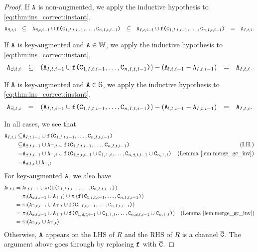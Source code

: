 \begin{proof}
If $\tt{A}$ is non-augmented, we apply the inductive hypothesis to \eqref{eq:thm:ins_correct:instant},
\begin{align*}
\tt{A}_{\exists,t,i}
&&\subseteq&& \tt{A}_{\exists,t,i-1} \cup \tt{f}\tt{(}\tt{C}_{1,I,t,i-1}, \dots, \tt{C}_{n,I,t,i-1}\tt{)}
&&\subseteq&& \tt{A}_{I,t,i-1} \cup \tt{f}\tt{(}\tt{C}_{1,I,t,i-1}, \dots, \tt{C}_{n,I,t,i-1}\tt{)}
&&=&& \tt{A}_{I,t,i}.
\end{align*}

If $\tt{A}$ is key-augmented and $\tt{A} \in \mathbb{W}$, we apply the inductive hypothesis to \eqref{eq:thm:ins_correct:instant},
\begin{align*}
\tt{A}_{\exists,t,i}
&&\subseteq&& (\tt{A}_{I,t,i-1} \cup \tt{f}\tt{(}\tt{C}_{1,I,t,i-1}, \dots, \tt{C}_{n,I,t,i-1}\tt{)}) - (\tt{A}_{!,t,i-1} - \tt{A}_{I,t,i-1})
&&=&& \tt{A}_{I,t,i}.
\end{align*}

If $\tt{A}$ is key-augmented and $\tt{A} \in \mathbb{S}$, we apply the inductive hypothesis to \eqref{eq:thm:ins_correct:instant},
\begin{align*}
\tt{A}_{\exists,t,i}
&&=&& (\tt{A}_{I,t,i-1} \cup \tt{f}\tt{(}\tt{C}_{1,I,t,i-1}, \dots, \tt{C}_{n,I,t,i-1}\tt{)}) - (\tt{A}_{!,t,i-1} - \tt{A}_{I,t,i-1})
&&=&& \tt{A}_{I,t,i}.
\end{align*}

In all cases, we see that
\begin{align*}
\tt{A}_{I,t,i}
\subseteq& \tt{A}_{I,t,i-1} \cup \tt{f}\tt{(}\tt{C}_{1,I,t,i-1}, \dots, \tt{C}_{n,I,t,i-1}\tt{)}\\
\subseteq& \tt{A}_{\exists,t,i-1} \cup \tt{A}_{\top,t} \cup \tt{f}\tt{(}\tt{C}_{1,I,t,i-1}, \dots, \tt{C}_{n,I,t,i-1}\tt{)} & \text{(I.H.)}\\
=& \tt{A}_{\exists,t,i-1} \cup \tt{A}_{\top,t} \cup \tt{f}\tt{(}\tt{C}_{1,\exists,t,i-1} \cup \tt{C}_{1,\top,t}, \dots, \tt{C}_{n,\exists,t,i-1} \cup \tt{C}_{n,\top,t}\tt{)} & \text{(Lemma \ref{lem:merge_gc_inv})}\\
=& \tt{A}_{\exists,t,i} \cup \tt{A}_{\top,t}
\end{align*}
For key-augmented $\tt{A}$, we also have
\begin{align*}
\tt{A}_{!,t,i}
&= \tt{A}_{!,t,i-1} \cup \pi_!(\tt{f}\tt{(}\tt{C}_{1,I,t,i-1}, \dots, \tt{C}_{n,I,t,i-1}\tt{)})\\
&= \pi_!(\tt{A}_{\exists,t,i-1} \cup \tt{A}_{\top,t}) \cup \pi_!(\tt{f}\tt{(}\tt{C}_{1,I,t,i-1}, \dots, \tt{C}_{n,I,t,i-1}\tt{)})\\
&= \pi_!(\tt{A}_{\exists,t,i-1} \cup \tt{A}_{\top,t} \cup \tt{f}\tt{(}\tt{C}_{1,I,t,i-1}, \dots, \tt{C}_{n,I,t,i-1}\tt{)})\\
&= \pi_!(\tt{A}_{\exists,t,i-1} \cup \tt{A}_{\top,t} \cup \tt{f}\tt{(}\tt{C}_{1,\exists,t,i-1} \cup \tt{C}_{1,\top,t}, \dots, \tt{C}_{n,\exists,t,i-1} \cup \tt{C}_{n,\top,t}\tt{)}) & \text{(Lemma \ref{lem:merge_gc_inv})}\\
&= \pi_!(\tt{A}_{\exists,t,i} \cup \tt{A}_{\top,t}).
\end{align*}
Otherwise, $\tt{A}$ appears on the LHS of $R$ and the RHS of $R$ is a channel $\overline{\tt{C}}$.
The argument above goes through by replacing $\tt{f}$ with $\overline{\tt{C}}$.


\end{proof}
